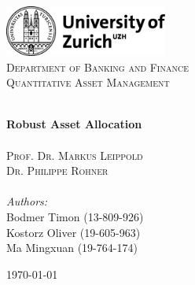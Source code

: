 
\begin{titlepage}
\vbox{ }
\vbox{ }
\begin{center}

\includegraphics[width=0.40\textwidth]{Images/uzh_logo.jpg}\\[1cm]
\textsc{\Large Department of Banking and Finance}\\[1.5cm]
\textsc{\LARGE Quantitative Asset Management }\\[1.0cm]

\vbox{ }

\HRule \\[0.4cm]
{ \huge \bfseries 
Robust Asset Allocation }\\[0.4cm]
\HRule \\[1.5cm]


\textsc{\Large Prof. Dr. Markus Leippold }\\[0.5cm]
\textsc{\Large Dr. Philippe Rohner}\\[0.5cm]
\textsc{\Large  }\\[0.5cm]

\large
\emph{Authors:}\\
Bodmer Timon (13-809-926)\\
Kostorz Oliver (19-605-963)\\
Ma Mingxuan (19-764-174)\\
\vfill

{\large \today}
\end{center}
\end{titlepage}